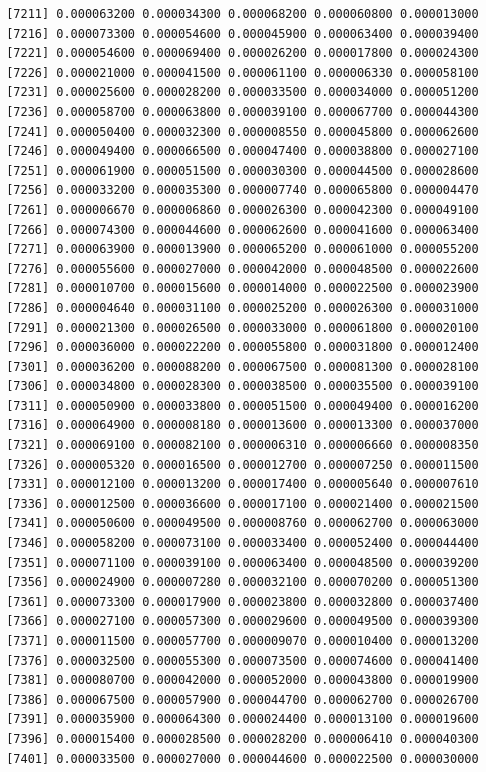 \documentclass[]{article}
\begin{document}
\begin{verbatim}
 [7211] 0.000063200 0.000034300 0.000068200 0.000060800 0.000013000
 [7216] 0.000073300 0.000054600 0.000045900 0.000063400 0.000039400
 [7221] 0.000054600 0.000069400 0.000026200 0.000017800 0.000024300
 [7226] 0.000021000 0.000041500 0.000061100 0.000006330 0.000058100
 [7231] 0.000025600 0.000028200 0.000033500 0.000034000 0.000051200
 [7236] 0.000058700 0.000063800 0.000039100 0.000067700 0.000044300
 [7241] 0.000050400 0.000032300 0.000008550 0.000045800 0.000062600
 [7246] 0.000049400 0.000066500 0.000047400 0.000038800 0.000027100
 [7251] 0.000061900 0.000051500 0.000030300 0.000044500 0.000028600
 [7256] 0.000033200 0.000035300 0.000007740 0.000065800 0.000004470
 [7261] 0.000006670 0.000006860 0.000026300 0.000042300 0.000049100
 [7266] 0.000074300 0.000044600 0.000062600 0.000041600 0.000063400
 [7271] 0.000063900 0.000013900 0.000065200 0.000061000 0.000055200
 [7276] 0.000055600 0.000027000 0.000042000 0.000048500 0.000022600
 [7281] 0.000010700 0.000015600 0.000014000 0.000022500 0.000023900
 [7286] 0.000004640 0.000031100 0.000025200 0.000026300 0.000031000
 [7291] 0.000021300 0.000026500 0.000033000 0.000061800 0.000020100
 [7296] 0.000036000 0.000022200 0.000055800 0.000031800 0.000012400
 [7301] 0.000036200 0.000088200 0.000067500 0.000081300 0.000028100
 [7306] 0.000034800 0.000028300 0.000038500 0.000035500 0.000039100
 [7311] 0.000050900 0.000033800 0.000051500 0.000049400 0.000016200
 [7316] 0.000064900 0.000008180 0.000013600 0.000013300 0.000037000
 [7321] 0.000069100 0.000082100 0.000006310 0.000006660 0.000008350
 [7326] 0.000005320 0.000016500 0.000012700 0.000007250 0.000011500
 [7331] 0.000012100 0.000013200 0.000017400 0.000005640 0.000007610
 [7336] 0.000012500 0.000036600 0.000017100 0.000021400 0.000021500
 [7341] 0.000050600 0.000049500 0.000008760 0.000062700 0.000063000
 [7346] 0.000058200 0.000073100 0.000033400 0.000052400 0.000044400
 [7351] 0.000071100 0.000039100 0.000063400 0.000048500 0.000039200
 [7356] 0.000024900 0.000007280 0.000032100 0.000070200 0.000051300
 [7361] 0.000073300 0.000017900 0.000023800 0.000032800 0.000037400
 [7366] 0.000027100 0.000057300 0.000029600 0.000049500 0.000039300
 [7371] 0.000011500 0.000057700 0.000009070 0.000010400 0.000013200
 [7376] 0.000032500 0.000055300 0.000073500 0.000074600 0.000041400
 [7381] 0.000080700 0.000042000 0.000052000 0.000043800 0.000019900
 [7386] 0.000067500 0.000057900 0.000044700 0.000062700 0.000026700
 [7391] 0.000035900 0.000064300 0.000024400 0.000013100 0.000019600
 [7396] 0.000015400 0.000028500 0.000028200 0.000006410 0.000040300
 [7401] 0.000033500 0.000027000 0.000044600 0.000022500 0.000030000

\end{verbatim}
\end{document}
